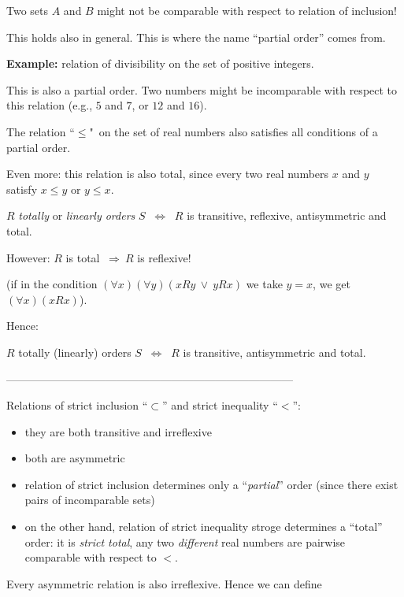 \documentclass[11pt,paper=b5,footinclude,headinclude]{scrbook} %
\def\ali {{~\vee~}}
\def\sledi {{~\Rightarrow~}}
\def\cee {{~\Leftrightarrow~}}
\theoremstyle{remark}
\theoremstyle{definition} %
\theoremstyle{theorem} %
\begin{document}
Two sets $A$ and $B$ might not be comparable with respect to relation of inclusion!

This holds also in general. This is where the name ``partial order'' comes from.

\medskip
\textbf{ Example:} relation of divisibility on the set of positive integers.

This is also a partial order. Two numbers might be incomparable
with respect to this relation (e.g., $5$ and $7$, or $12$ and $16$).

\bigskip
The relation  ``$\le$"~on the set of real numbers also satisfies all conditions of a partial order.

Even more: this relation is also total, since every two real numbers $x$ and $y$ satisfy $x\le y$ or $y\le x$.


\bigskip

$R$ {\em totally} or {\em linearly orders} $S$ $\cee$ $R$ is transitive, reflexive,
antisymmetric and total.

\bigskip
However: $R$ is total  $\sledi R$ is reflexive!

(if in the condition $(\forall x)(\forall y)(xRy \ali yRx)$ we take $y = x$, we get
$(\forall x)(xRx)$).

Hence:

$R$ {totally (linearly) orders} $S$ $\cee$ $R$ is transitive, antisymmetric and total.

\bigskip

------------------------------------------------------------------------------


\bigskip

Relations of strict inclusion ``$\subset$'' and strict inequality ``$<$'':
\begin{itemize}
  \item they are both transitive and irreflexive
  \item both are asymmetric
  \item relation of strict inclusion determines only a ``{\em partial}'' order (since there exist pairs of incomparable sets)
  \item on the other hand, relation of strict inequality stroge determines a ``total'' order: it is {\em strict total}, any two {\em different} real numbers are pairwise comparable with respect to $<$.
\end{itemize}

Every asymmetric relation is also irreflexive. Hence we can define
\end{document}
